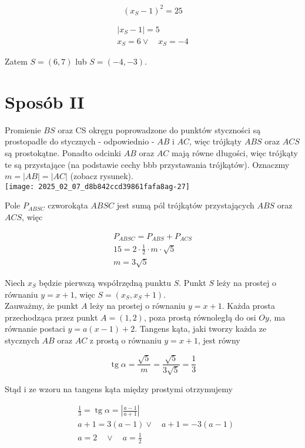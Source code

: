 \documentclass[10pt]{article}
\begin{document}
$$
\left(x_{S}-1\right)^{2}=25
$$

$$
\begin{gathered}
\left|x_{S}-1\right|=5 \\
x_{S}=6 \vee \quad x_{S}=-4
\end{gathered}
$$

Zatem $S=(6,7)$ lub $S=(-4,-3)$.

\section*{Sposób II}
Promienie $B S$ oraz CS okręgu poprowadzone do punktów styczności są prostopadłe do stycznych - odpowiednio - $A B$ i $A C$, więc trójkąty $A B S$ oraz $A C S$ są prostokątne. Ponadto odcinki $A B$ oraz $A C$ mają równe długości, więc trójkąty te są przystające (na podstawie cechy bbb przystawania trójkątów). Oznaczmy $m=|A B|=|A C|$ (zobacz rysunek).\\
\texttt{[image: 2025\_02\_07\_d8b842ccd39861fafa8ag-27]}

Pole $P_{A B S C}$ czworokąta $A B S C$ jest sumą pól trójkątów przystających $A B S$ oraz $A C S$, więc

$$
\begin{gathered}
P_{A B S C}=P_{A B S}+P_{A C S} \\
15=2 \cdot \frac{1}{2} \cdot m \cdot \sqrt{5} \\
m=3 \sqrt{5}
\end{gathered}
$$

Niech $x_{S}$ będzie pierwszą współrzędną punktu $S$. Punkt $S$ leży na prostej o równaniu $y=x+1$, więc $S=\left(x_{S}, x_{S}+1\right)$.\\
Zauważmy, że punkt $A$ leży na prostej o równaniu $y=x+1$. Każda prosta przechodząca przez punkt $A=(1,2)$, poza prostą równoległą do osi $O y$, ma równanie postaci $y=a(x-1)+2$. Tangens kąta, jaki tworzy każda ze stycznych $A B$ oraz $A C$ z prostą o równaniu $y=x+1$, jest równy

$$
\operatorname{tg} \alpha=\frac{\sqrt{5}}{m}=\frac{\sqrt{5}}{3 \sqrt{5}}=\frac{1}{3}
$$

Stąd i ze wzoru na tangens kąta między prostymi otrzymujemy

$$
\begin{aligned}
& \frac{1}{3}=\operatorname{tg} \alpha=\left|\frac{a-1}{a+1}\right| \\
& a+1=3(a-1) \vee \quad a+1=-3(a-1) \\
& a=2 \quad \vee \quad a=\frac{1}{2}
\end{aligned}
$$
\end{document}
